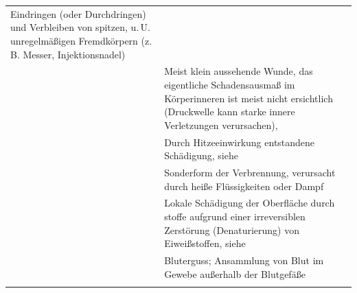 {\begin{tabulary}{\linewidth}{lLL}
Eindringen (oder Durchdringen) und Verbleiben von spitzen,
u.\,U. unregelmäßigen Fremdkörpern (z.\,B. Messer,
Injektionsnadel) 
& 
\noindent{}
\\\addlinespace 
\noindent{} 
&
Meist klein aussehende Wunde, das eigentliche Schadensausmaß im Körperinneren
ist meist nicht ersichtlich (Druckwelle kann starke innere
Verletzungen verursachen),
& 
\noindent{}
\\\addlinespace
\noindent{} 
&
Durch Hitzeeinwirkung entstandene Schädigung, siehe 
& 
\noindent{}
\\\addlinespace
\noindent{} 
&
Sonderform der Verbrennung, verursacht durch heiße Flüssigkeiten oder Dampf
& 
\noindent{}
\\\addlinespace
\noindent{} 
&
Lokale Schädigung der
Oberfläche durch stoffe aufgrund einer irreversiblen Zerstörung (Denaturierung) von
Eiweißstoffen, siehe 
& 
\noindent{}
\\\addlinespace
\noindent{} 
&
Bluterguss; Ansammlung von Blut im Gewebe außerhalb der Blutgefäße 
& 
\noindent{}
\\\addlinespace\bottomrule
\end{tabulary}
}%
{}%



